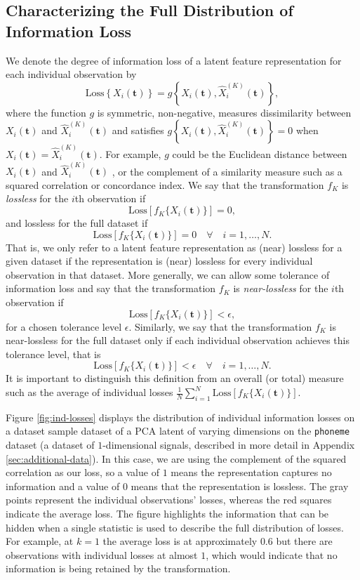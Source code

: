 \subsection{Characterizing the Full Distribution of Information Loss}\label{sec:characterising-information-loss}

We denote the degree of information loss of a latent feature representation for each individual observation by 
$$
\text{Loss} \left\{ X_i(\mathbf{t}) \right\} 
= g\left\{ X_i(\mathbf{t}), \widehat{X}_i^{(K)}(\mathbf{t}) \right\},
$$
where the function $g$ is symmetric, non-negative, measures dissimilarity between $X_i(\mathbf{t})$ and $\widehat{X}_i^{(K)}(\mathbf{t})$ and satisfies $g\left\{ X_i(\mathbf{t}), \widehat{X}_i^{(K)}(\mathbf{t}) \right\}=0$ when $X_i(\mathbf{t})=\widehat{X}_i^{(K)}(\mathbf{t})$.
For example, $g$ could be the Euclidean distance between $X_i(\mathbf{t})$ and $\widehat{X}_i^{(K)}(\mathbf{t})$ \parencite{morris_comparison_2017}, or the complement of a similarity measure such as a squared correlation or concordance index.
We say that the transformation $f_K$ is \emph{lossless} for the $i$th observation if
$$
\text{Loss} \left[ f_K\{X_i(\mathbf{t})\} \right] = 0,
$$
and lossless for the full dataset if
$$
\text{Loss} \left[ f_K\{X_i(\mathbf{t})\} \right] = 0 \quad \forall \quad  i = 1, \dots, N.
$$
That is, we only refer to a latent feature representation as (near) lossless for a given dataset if the representation is (near) lossless for every individual observation in that dataset.
More generally, we can allow some tolerance of information loss and say that
the transformation $f_K$ is \emph{near-lossless} for the $i$th observation if
$$
\text{Loss} \left[ f_K\{X_i(\mathbf{t})\} \right] < \epsilon,
$$
for a chosen tolerance level $\epsilon$. 
Similarly, we say that the transformation $f_K$ is near-lossless for the full dataset only if each individual observation achieves this tolerance level, that is
$$
\text{Loss} \left[ f_K\{X_i(\mathbf{t})\} \right] < \epsilon \quad \forall \quad  i = 1, \dots, N.
$$
It is important to distinguish this definition from an overall (or total) measure such as the average of individual losses $\frac{1}{N}\sum_{i=1}^N \text{Loss} \left[ f_K\{X_i(\mathbf{t})\} \right]$.

Figure \ref{fig:ind-losses} displays the distribution of individual information losses on a dataset sample dataset of a PCA latent of varying dimensions on the \texttt{phoneme} dataset (a dataset of $1$-dimensional signals, described in more detail in Appendix \ref{sec:additional-data}).
In this case, we are using the complement of the squared correlation as our loss, so a value of $1$ means the representation captures no information and a value of $0$ means that the representation is lossless.
The gray points represent the individual observations' losses, whereas the red squares indicate the average loss.
The figure highlights the information that can be hidden when a single statistic is used to describe the full distribution of losses. For example, at $k = 1$ the average loss is at approximately $0.6$ but there are observations with individual losses at almost $1$, which would indicate that no information is being retained by the transformation.


